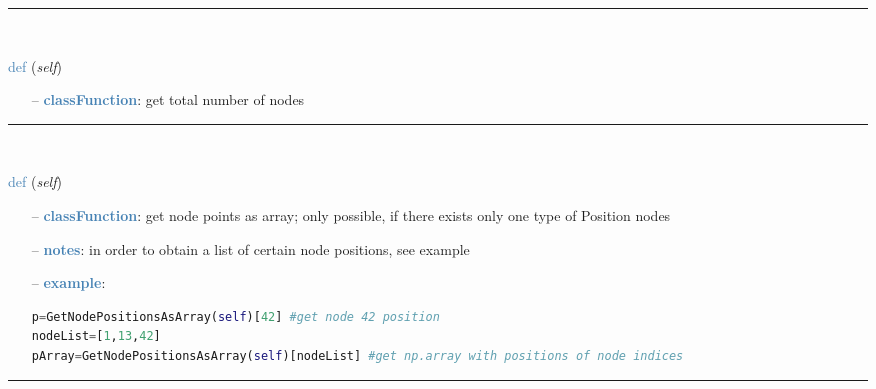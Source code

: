 \begin{itemize}[leftmargin=1.4cm]
\begin{itemize}[leftmargin=1.4cm]
\begin{itemize}[leftmargin=0.5cm]
\begin{itemize}[leftmargin=1.4cm]
\begin{itemize}[leftmargin=1.4cm]
\begin{itemize}[leftmargin=0.5cm]
%
\noindent\rule{8cm}{0.75pt}\vspace{1pt} \\ 
\begin{flushleft}
\noindent \textcolor{steelblue}{def {\bf {}}}\label{sec:FEM:FEMinterface:NumberOfNodes}
({\it self})
\end{flushleft}
\setlength{\itemindent}{0.7cm}
\begin{itemize}[leftmargin=0.7cm]
  \item[--]  \textcolor{steelblue}{\bf classFunction}: get total number of nodes\vspace{12pt}\end{itemize}
%
\noindent\rule{8cm}{0.75pt}\vspace{1pt} \\ 
\begin{flushleft}
\noindent \textcolor{steelblue}{def {\bf {}}}\label{sec:FEM:FEMinterface:GetNodePositionsAsArray}
({\it self})
\end{flushleft}
\setlength{\itemindent}{0.7cm}
\begin{itemize}[leftmargin=0.7cm]
  \item[--]  \textcolor{steelblue}{\bf classFunction}: get node points as array; only possible, if there exists only one type of Position nodes  \item[--]  \textcolor{steelblue}{\bf notes}: in order to obtain a list of certain node positions, see example  \item[--]  \textcolor{steelblue}{\bf example}: \vspace{-12pt}\ei\begin{lstlisting}[language=Python, xleftmargin=36pt]
p=GetNodePositionsAsArray(self)[42] #get node 42 position
nodeList=[1,13,42]
pArray=GetNodePositionsAsArray(self)[nodeList] #get np.array with positions of node indices\end{lstlisting}\vspace{-24pt}\bi\item[]\vspace{-24pt}\vspace{12pt}\end{itemize}
%
\noindent\rule{8cm}{0.75pt}\vspace{1pt} \\ 
\begin{flushleft}

\end{flushleft}
\end{itemize}
\end{itemize}
\end{itemize}
\end{itemize}
\end{itemize}
\end{itemize}
